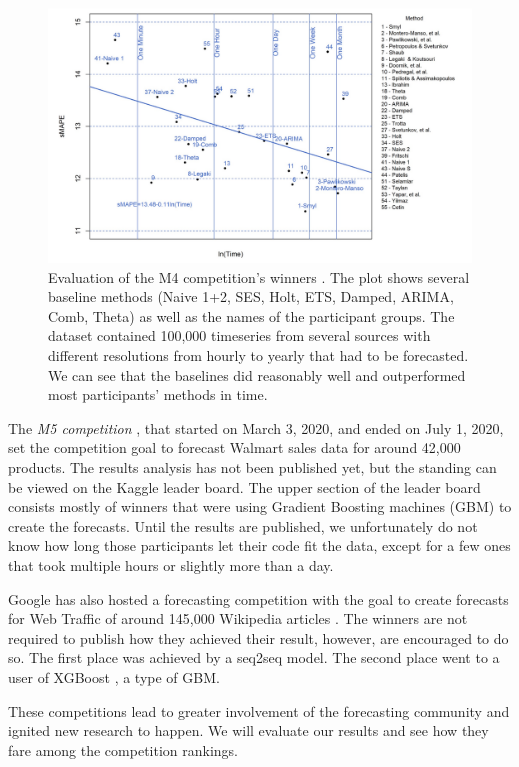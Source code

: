 \begin{figure}
\centerline{\includegraphics[scale=.25]{Figures/m4-time-vs-error.jpg}}
\caption{Evaluation of the M4 competition's winners \cite{M4}. The plot shows several baseline methods (Naive 1+2, SES, Holt, ETS, Damped, ARIMA, Comb, Theta) as well as the names of the participant groups. The dataset contained 100,000 timeseries from several sources with different resolutions from hourly to yearly that had to be forecasted. We can see that the baselines did reasonably well and outperformed most participants' methods in time.}
\label{fig:m4-time-vs-error}
\end{figure}

The \emph{M5 competition} \cite{M5}, that started on March 3, 2020, and ended on July 1, 2020, set the competition goal to forecast Walmart sales data for around 42,000 products. The results analysis has not been published yet, but the standing can be viewed on the Kaggle leader board. The upper section of the leader board consists mostly of winners that were using Gradient Boosting machines (GBM) to create the forecasts. Until the results are published, we unfortunately do not know how long those participants let their code fit the data, except for a few ones that took multiple hours or slightly more than a day.

Google has also hosted a forecasting competition with the goal to create forecasts for Web Traffic of around 145,000 Wikipedia articles \cite{web-traffic-competition}. The winners are not required to publish how they achieved their result, however, are encouraged to do so. The first place was achieved by a seq2seq \cite{seq2seq} model. The second place went to a user of XGBoost \cite{xgboost}, a type of GBM.

These competitions lead to greater involvement of the forecasting community and ignited new research to happen. We will evaluate our results and see how they fare among the competition rankings. 

